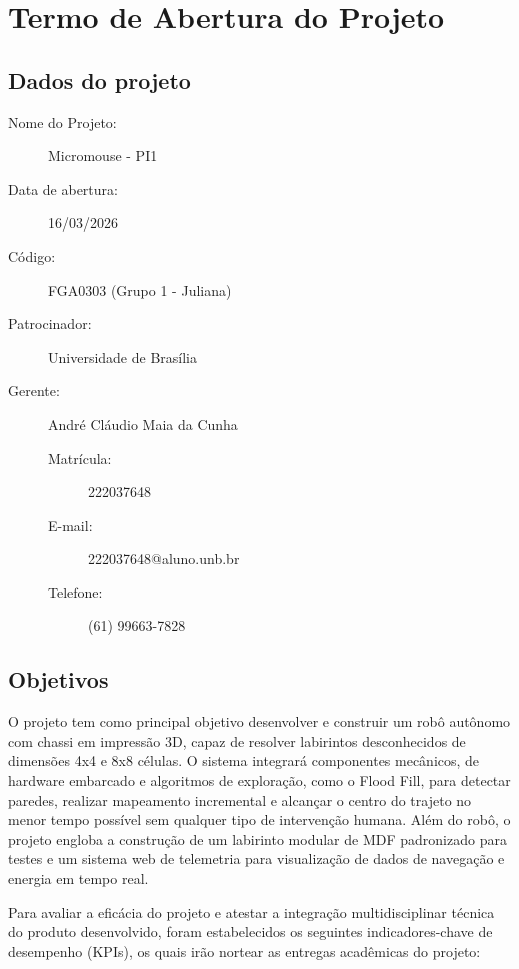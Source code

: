 \chapter{Termo de Abertura do Projeto}

\section{Dados do projeto}
\begin{description}
    \item [Nome do Projeto:] Micromouse - PI1
    \item [Data de abertura:] 16/03/2026
    \item [Código:] FGA0303 (Grupo 1 - Juliana)
    \item [Patrocinador:] Universidade de Brasília
    \item [Gerente:] André Cláudio Maia da Cunha
        \begin{description}
            \item [Matrícula:] 222037648
            \item [E-mail:] 222037648@aluno.unb.br
            \item [Telefone:] (61) 99663-7828
        \end{description}
\end{description}

\section{Objetivos}

O projeto tem como principal objetivo desenvolver e construir um robô autônomo com chassi em impressão 3D, capaz de resolver labirintos desconhecidos de dimensões 4x4 e 8x8 células. O sistema integrará componentes mecânicos, de hardware embarcado
e algoritmos de exploração, como o Flood Fill, para detectar paredes, realizar mapeamento incremental e alcançar o centro do trajeto no menor tempo possível sem qualquer tipo de intervenção humana. Além do robô, o projeto engloba a construção de um labirinto
modular de MDF padronizado para testes e um sistema web de telemetria para visualização de dados de navegação e energia em tempo real.

Para avaliar a eficácia do projeto e atestar a integração multidisciplinar técnica do produto desenvolvido, foram estabelecidos os seguintes indicadores-chave de desempenho (KPIs), os quais irão nortear as entregas acadêmicas do projeto:

